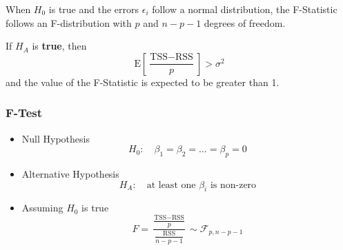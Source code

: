 \documentclass[11pt]{article}
\newcommand*\ev[1]{\mathrel{\text{E}\left[#1\right]}}
\newcommand*\F[1]{\mathcal{F}_{#1}}
\begin{document}
When $H_0$ is true and the errors $\epsilon_i$ follow a normal distribution, the F-Statistic follows an F-distribution with $p$ and $n-p-1$ degrees of freedom.

If $H_A$ is \textbf{true}, then 
\begin{equation*}
	\ev{\frac{\text{TSS}-\text{RSS}}{p}} > \sigma^2
\end{equation*}
and the value of the F-Statistic is expected to be greater than 1.

\subsubsection{F-Test}
\begin{itemize}[label=]
	\item Null Hypothesis
	\begin{equation*}
		H_0:\quad \beta_1 = \beta_2 = \dots = \beta_p = 0
	\end{equation*}
	\item Alternative Hypothesis
	\begin{equation*}
		H_A:\quad \text{at least one $\beta_i$ is non-zero}
	\end{equation*}
	\item Assuming $H_0$ is true
	\begin{equation*}
	F = \frac{\frac{\text{TSS} - \text{RSS}}{p}}{\frac{\text{RSS}}{n-p-1}} \sim \F{p,n-p-1}
	\end{equation*}
\end{itemize}
\end{document}
